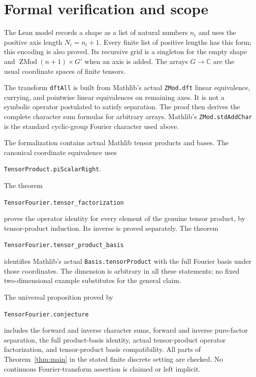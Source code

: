 \documentclass[11pt]{article}
\newcommand{\C}{\mathbb C}
\begin{document}
\section{Formal verification and scope}
The Lean model records a shape as a list of natural numbers $n_i$ and
uses the positive axis length $N_i=n_i+1$. Every finite list of positive
lengths has this form; this encoding is also proved. Its recursive grid
is a singleton for the empty shape and
$\operatorname{ZMod}(n+1)\times G'$ when an axis is added.
The arrays $G\to\C$ are the usual coordinate spaces of finite tensors.

The transform \texttt{dftAll} is built from Mathlib's actual
\texttt{ZMod.dft} linear equivalence, currying, and pointwise linear
equivalences on remaining axes. It is not a symbolic operator postulated
to satisfy separation. The proof then derives the complete character
sum formulas for arbitrary arrays. Mathlib's \texttt{ZMod.stdAddChar}
is the standard cyclic-group Fourier character used above.

The formalization contains actual Mathlib tensor products and bases.
The canonical coordinate equivalence uses
\begin{center}
\texttt{TensorProduct.piScalarRight}.
\end{center}
The theorem
\begin{center}
\texttt{TensorFourier.tensor\_factorization}
\end{center}
proves the operator identity for every element of the genuine tensor
product, by tensor-product induction. Its inverse is proved separately.
The theorem
\begin{center}
\texttt{TensorFourier.tensor\_product\_basis}
\end{center}
identifies Mathlib's actual \texttt{Basis.tensorProduct} with the full
Fourier basis under those coordinates. The dimension is arbitrary in
all these statements; no fixed two-dimensional example substitutes
for the general claim.

The universal proposition proved by
\begin{center}
\texttt{TensorFourier.conjecture}
\end{center}
includes the forward and inverse character sums, forward and inverse
pure-factor separation, the full product-basis identity, actual
tensor-product operator factorization, and tensor-product basis
compatibility. All parts of Theorem~\ref{thm:main} in the stated finite
discrete setting are checked. No continuous Fourier-transform assertion
is claimed or left implicit.
\end{document}
